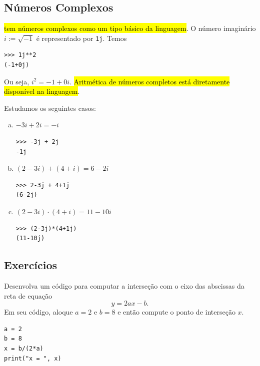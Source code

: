 \subsection{Números Complexos}

\hl{{\python} tem números complexos como um tipo básico da linguagem}. O número imaginário $i := \sqrt{-1}$ é representado por \lstinline+1j+. Temos

\begin{lstlisting}
>>> 1j**2
(-1+0j)
\end{lstlisting}

Ou seja, $i^2 = -1 + 0i$. \hl{Aritmética de números completos está diretamente disponível na linguagem}.

\begin{ex}
  Estudamos os seguintes casos:
  \begin{enumerate}[a)]
  \item $-3i + 2i = -i$

\begin{lstlisting}[framexrightmargin=-1.5em]
>>> -3j + 2j
-1j
\end{lstlisting}

  \item $(2 - 3i) + (4 + i) = 6 -2i$

\begin{lstlisting}[framexrightmargin=-1.5em]
>>> 2-3j + 4+1j
(6-2j)
\end{lstlisting}

  \item $(2 - 3i)\cdot (4 + i) = 11 - 10i$

\begin{lstlisting}[framexrightmargin=-1.5em]
>>> (2-3j)*(4+1j)
(11-10j)
\end{lstlisting}

\end{enumerate}
\end{ex}

\subsection{Exercícios}

\begin{exer}
  Desenvolva um código {\python} para computar a interseção com o eixo das abscissas da reta de equação
  \begin{equation}
    y =  2ax - b.
  \end{equation}
  Em seu código, aloque $a=2$ e $b=8$ e então compute o ponto de interseção $x$.
\end{exer}
\begin{resp}

\begin{lstlisting}
a = 2
b = 8
x = b/(2*a)
print("x = ", x)
\end{lstlisting}

\end{resp}

